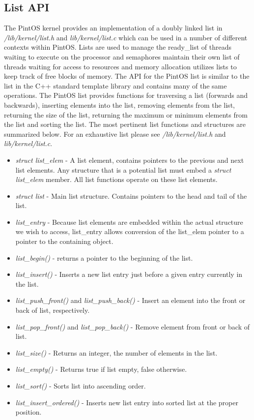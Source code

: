 \documentclass[11pt, letterpaper]{article}
\begin{document}
\subsection{List API}
The PintOS kernel provides an implementation of a doubly linked list in \textit{/lib/kernel/list.h} and \textit{lib/kernel/list.c} which can be used in a number of different contexts within PintOS. Lists are used to manage the ready\_list of threads
  waiting to execute on the processor and semaphores maintain their own list of threads waiting for access to resources and memory allocation utilizes lists to keep track of free blocks of memory. The API for the PintOS list is similar to the list in the C++ standard template library and contains many of the same operations. The PintOS list provides functions for traversing a list (forwards and backwards), inserting elements into the list, removing elements from the list, returning the size of the list, returning the maximum or minimum elements from the list and sorting the list. The most pertinent list functions and structures are summarized below. For an exhaustive list please see \textit{/lib/kernel/list.h} and \textit{lib/kernel/list.c}.
  
\begin{itemize}

\item \textit{struct list\_elem} - A list element, contains pointers to the previous and next list elements. Any structure that is a potential list must embed a \textit{struct list\_elem} member. All list functions operate on these  list elements.
\item \textit{struct list} - Main list structure. Contains pointers to the head and tail of the list.    
  
\item \textit{list\_entry} - Because list elements are embedded within the actual structure we wish to access, list\_entry allows conversion of the list\_elem pointer to a pointer to the containing object.

\item \textit{list\_begin()} - returns a pointer to the beginning of the list.
\item \textit{list\_insert()} - Inserts a new list entry just before a given entry currently in the list.
\item \textit{list\_push\_front()} and \textit{list\_push\_back()} - Insert an element into the front or back of list, respectively.

\item \textit{list\_pop\_front()} and \textit{list\_pop\_back()} - Remove element from front or back of list.
  
\item \textit{list\_size()} - Returns an integer, the number of elements in the list.
\item \textit{list\_empty()} - Returns true if list empty, false otherwise.
\item \textit{list\_sort()} - Sorts list into ascending order.
\item \textit{list\_insert\_ordered()} - Inserts new list entry into sorted list at the proper position.
  
\end{itemize}  
  
\end{document}
